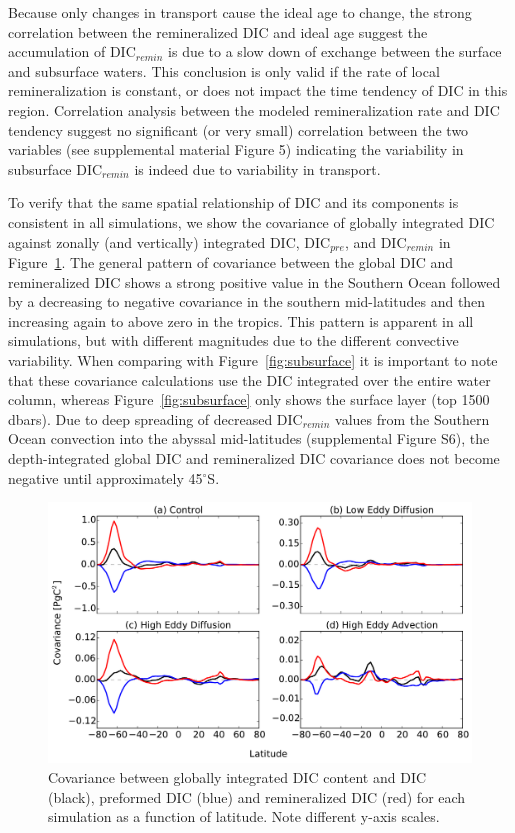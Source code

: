 Because only changes in transport cause the ideal age to change, the strong
correlation between the remineralized DIC and ideal age suggest the accumulation
of DIC$_{remin}$ is due to a slow down of exchange between the surface and
subsurface waters. This conclusion is only valid if the rate of local
remineralization is constant, or does not impact the time tendency of DIC in
this region. Correlation analysis between the modeled remineralization rate and
DIC tendency suggest no significant (or very small) correlation between the two
variables (see supplemental material Figure 5) indicating the variability in
subsurface DIC$_{remin}$ is indeed due to variability in transport.

To verify that the same spatial relationship of DIC and its components is
consistent in all simulations, we show the covariance of globally integrated DIC
against zonally (and vertically) integrated DIC, DIC$_{pre}$, and DIC$_{remin}$
in Figure~\ref{fig:covariance}. The general pattern of covariance between the
global DIC and remineralized DIC shows a strong positive value in the Southern
Ocean followed by a decreasing to negative covariance in the southern mid-latitudes
and then increasing again to above zero in the tropics. This pattern is apparent
in all simulations, but with different magnitudes due to the different convective
variability. When comparing with Figure~\ref{fig:subsurface} it
is important to note that these covariance calculations use the DIC integrated
over the entire water column, whereas Figure~\ref{fig:subsurface} only shows the
surface layer (top 1500 dbars). Due to deep spreading of decreased DIC$_{remin}$
values from the Southern Ocean convection into the abyssal mid-latitudes (supplemental
Figure S6),
the depth-integrated global DIC and remineralized DIC covariance does not become
negative until approximately 45$^{\circ}$S.



\begin{figure}
\noindent
\centering
\includegraphics[width=33pc]{figure12.pdf}
\caption{Covariance between globally integrated DIC content and DIC (black),
preformed DIC (blue) and remineralized DIC (red) for each simulation as a
function of latitude. Note different y-axis scales.}
\label{fig:covariance}
\end{figure}

